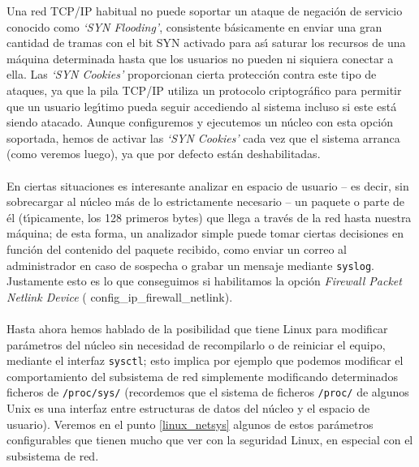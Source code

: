 Una red TCP/IP habitual no puede soportar un ataque de negaci\'on de servicio
conocido como {\it `SYN Flooding'}, consistente b\'asicamente en enviar una
gran cantidad de tramas con el bit SYN activado para as\'{\i} saturar los
recursos de una m\'aquina determinada hasta que los usuarios no pueden ni
siquiera conectar a ella. Las {\it `SYN Cookies'} proporcionan
cierta protecci\'on contra este tipo de ataques, ya que la pila TCP/IP utiliza
un protocolo criptogr\'afico para permitir que un usuario leg\'{\i}timo pueda
seguir accediendo al sistema incluso si este est\'a siendo atacado. Aunque
configuremos y ejecutemos un n\'ucleo con esta opci\'on soportada, hemos de
activar las {\it `SYN Cookies'} cada vez que el sistema arranca (como veremos
luego), ya que por defecto est\'an deshabilitadas.\\
\\En ciertas situaciones es interesante analizar en espacio de usuario -- es
decir, sin sobrecargar al n\'ucleo m\'as de lo estrictamente necesario -- un
paquete o parte de \'el (t\'{\i}picamente, los 128 primeros bytes) que llega a 
trav\'es de la red hasta nuestra m\'aquina; de esta forma, un analizador simple
puede tomar ciertas decisiones en funci\'on del contenido del paquete recibido,
como enviar un correo al administrador en caso de sospecha o grabar un mensaje
mediante {\tt syslog}. Justamente esto es lo que conseguimos si habilitamos
la opci\'on {\it Firewall Packet Netlink Device} ({\sc 
config\_ip\_firewall\_netlink}).\\
\\Hasta ahora hemos hablado de la posibilidad que tiene Linux para modificar
par\'ametros del n\'ucleo sin necesidad de recompilarlo o de reiniciar el
equipo, mediante el interfaz {\tt sysctl}; esto implica por ejemplo que podemos
modificar el comportamiento del subsistema de red simplemente modificando 
determinados ficheros de {\tt /proc/sys/} (recordemos que el sistema de
ficheros {\tt /proc/} de algunos Unix es una interfaz entre estructuras de
datos del n\'ucleo y el espacio de usuario). Veremos en el punto 
\ref{linux_netsys} algunos de estos par\'ametros configurables que tienen 
mucho que ver con la seguridad Linux, en especial con el subsistema de red.
